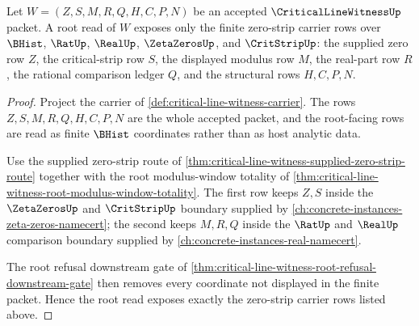 \begin{theorem}
\label{thm:critical-line-witness-root-zero-carrier}
Let $W=(Z,S,M,R,Q,H,C,P,N)$ be an accepted $\CriticalLineWitnessUp$ packet. A root read of $W$ exposes only the finite zero-strip carrier rows over $\BHist$, $\RatUp$, $\RealUp$, $\ZetaZerosUp$, and $\CritStripUp$: the supplied zero row $Z$, the critical-strip row $S$, the displayed modulus row $M$, the real-part row $R$, the rational comparison ledger $Q$, and the structural rows $H,C,P,N$.
\end{theorem}
\begin{proof}
Project the carrier of \autoref{def:critical-line-witness-carrier}. The rows $Z,S,M,R,Q,H,C,P,N$ are the whole accepted packet, and the root-facing rows are read as finite $\BHist$ coordinates rather than as host analytic data.

Use the supplied zero-strip route of \autoref{thm:critical-line-witness-supplied-zero-strip-route} together with the root modulus-window totality of \autoref{thm:critical-line-witness-root-modulus-window-totality}. The first row keeps $Z,S$ inside the $\ZetaZerosUp$ and $\CritStripUp$ boundary supplied by \autoref{ch:concrete-instances-zeta-zeros-namecert}; the second keeps $M,R,Q$ inside the $\RatUp$ and $\RealUp$ comparison boundary supplied by \autoref{ch:concrete-instances-real-namecert}.

The root refusal downstream gate of \autoref{thm:critical-line-witness-root-refusal-downstream-gate} then removes every coordinate not displayed in the finite packet. Hence the root read exposes exactly the zero-strip carrier rows listed above.
\end{proof}

